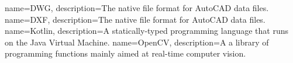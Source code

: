 
{
        name=DWG,
        description={The native file format for AutoCAD data files.}
}
{
        name=DXF,
        description={The native file format for AutoCAD data files.}
}
{
        name=Kotlin,
        description={A statically-typed programming language that runs on the Java Virtual Machine.}
}
{
        name=OpenCV,
        description={A a library of programming functions mainly aimed at real-time computer vision.}
}